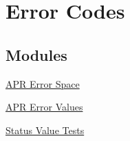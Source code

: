 \hypertarget{group__apr__errno}{}\section{Error Codes}
\label{group__apr__errno}
\subsection*{Modules}
\begin{DoxyCompactItemize}
\item 
\hyperlink{group___a_p_r___e_r_r_o_r__map}{A\+P\+R Error Space}
\item 
\hyperlink{group___a_p_r___error}{A\+P\+R Error Values}
\item 
\hyperlink{group___a_p_r___s_t_a_t_u_s___i_s}{Status Value Tests}
\end{DoxyCompactItemize}
